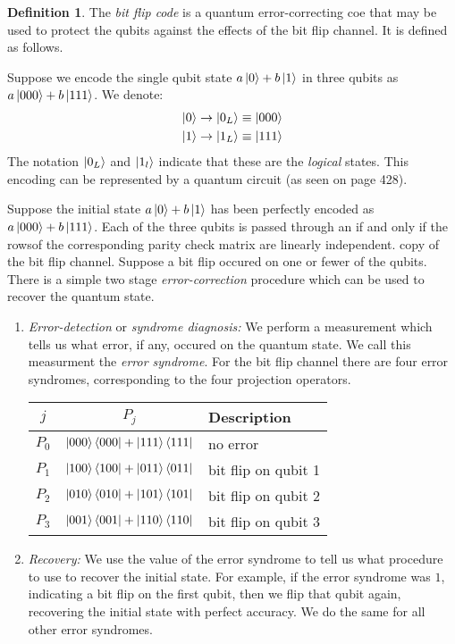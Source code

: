 \documentclass[11pt,a4paper]{article}
\theoremstyle{definition}
\newtheorem{definition}{Definition}[section]
\theoremstyle{plain}
\theoremstyle{remark}
\begin{document}
\begin{definition}
The \emph{bit flip code} is a quantum error-correcting coe that may be used to protect the qubits against the effects of the bit flip channel. It is defined as follows. 

Suppose we encode the single qubit state $a \ket{0} + b \ket{1}$ in three qubits as $a \ket{000} + b \ket{111}$. We denote: 
\begin{align*}
\ket{0} \to \ket{0_L} \equiv \ket{000} \\
\ket{1} \to \ket{1_L} \equiv \ket{111}
\end{align*}
The notation $\ket{0_L}$ and $\ket{1_l}$ indicate that these are the \emph{logical} states. 
This encoding can be represented by a quantum circuit (as seen on page 428).
\end{definition}

Suppose the initial state $a \ket{0} + b \ket{1}$ has been perfectly encoded as $a \ket{000} + b \ket{111}$. 
Each of the three qubits is passed through an if and only if the rowsof the 
corresponding parity check matrix are linearly independent.  copy of the bit flip channel. Suppose a bit flip occured on one or fewer of the qubits. There is a simple 
two stage \emph{error-correction} procedure which can be used to recover the quantum state. 

\begin{enumerate}
\item \emph{Error-detection} or \emph{syndrome diagnosis:} We perform a measurement which tells us what error, if any, occured on the quantum state. 
We call this measurment the \emph{error syndrome}. For the bit flip channel there are four error syndromes, corresponding to the four projection operators. 
\center 
\begin{table}[h]
\centering
\begin{tabular}{c|c|l}
\hline
$j$ & $P_j$ & Description \\
\hline
$P_0$ & $\ket{000}\bra{000} + \ket{111}\bra{111}$ & no error \\
$P_1$ & $\ket{100}\bra{100} + \ket{011}\bra{011}$ & bit flip on qubit 1 \\
$P_2$ & $\ket{010}\bra{010} + \ket{101}\bra{101}$ & bit flip on qubit 2 \\
$P_3$ & $\ket{001}\bra{001} + \ket{110}\bra{110}$ & bit flip on qubit 3 \\
\hline
\end{tabular}
\end{table}


\item \emph{Recovery:} We use the value of the error syndrome to tell us what procedure to use 
to recover the initial state. 
For example, if the error syndrome was $1$, indicating a bit flip on the first qubit, then we flip that qubit again, recovering the initial state with perfect accuracy. We do the same for 
all other error syndromes. 
\end{enumerate}
\end{document}
